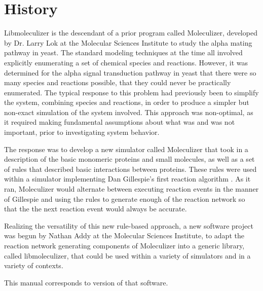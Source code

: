 \section{History}

Libmoleculizer is the descendant of a prior program called Moleculizer,
developed by Dr. Larry Lok at the Molecular Sciences Institute to
study the alpha mating pathway in yeast. The standard modeling
techniques at the time all involved explicitly enumerating a set of
chemical species and reactions. However, it was determined for the
alpha signal transduction pathway in yeast that there were so many
species and reactions possible, that they could never be practically
enumerated. The typical response to this problem had previously been
to simplify the system, combining species and reactions, in order to
produce a simpler but non-exact simulation of the system
involved. This approach was non-optimal, as it required making
fundamental assumptions about what was and was not important, prior to
investigating system behavior.

The response was to develop a new simulator called
Moleculizer\cite{lok05} that took in a description of the basic
monomeric proteins and small molecules, as well as a set of rules that
described basic interactions between proteins. These rules were used
within a simulator implementing Dan Gillespie's first reaction
algorithm \cite{gillespie77}.  As it ran, Moleculizer would alternate
between executing reaction events in the manner of Gillespie and using
the rules to generate enough of the reaction network so that the
 the next reaction event would always be accurate.

Realizing the versatility of this new rule-based approach, a new
software project was begun by Nathan Addy at the Molecular Sciences
Institute, to adapt the reaction network generating components of
Moleculizer into a generic library, called libmoleculizer, that could
be used within a variety of simulators and in a variety of contexts.

This manual corresponds to version \currentversion of that software. 